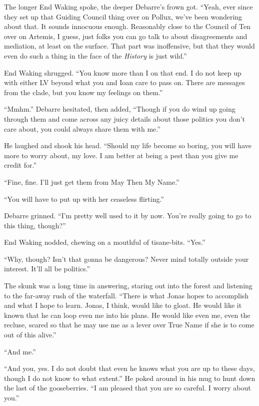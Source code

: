 The longer End Waking spoke, the deeper Debarre's frown got. ``Yeah, ever since they set up that Guiding Council thing over on Pollux, we've been wondering about that. It sounds innocuous enough. Reasonably close to the Council of Ten over on Artemis, I guess, just folks you can go talk to about disagreements and mediation, at least on the surface. That part was inoffensive, but that they would even do such a thing in the face of the \emph{History} is just wild.''

End Waking shrugged. ``You know more than I on that end. I do not keep up with either LV beyond what you and Ioan care to pass on. There are messages from the clade, but you know my feelings on them.''

``Mmhm.'' Debarre hesitated, then added, ``Though if you do wind up going through them and come across any juicy details about those politics you don't care about, you could always share them with me.''

He laughed and shook his head. ``Should my life become so boring, you will have more to worry about, my love. I am better at being a pest than you give me credit for.''

``Fine, fine. I'll just get them from May Then My Name.''

``You will have to put up with her ceaseless flirting.''

Debarre grinned. ``I'm pretty well used to it by now. You're really going to go to this thing, though?''

End Waking nodded, chewing on a mouthful of tisane-bits. ``Yes.''

``Why, though? Isn't that gonna be dangerous? Never mind totally outside your interest. It'll all be politics.''

The skunk was a long time in answering, staring out into the forest and listening to the far-away rush of the waterfall. ``There is what Jonas hopes to accomplish and what I hope to learn. Jonas, I think, would like to gloat. He would like it known that he can loop even me into his plans. He would like even me, even the recluse, scared so that he may use me as a lever over True Name if she is to come out of this alive.''

``And me.''

``And you, yes. I do not doubt that even he knows what you are up to these days, though I do not know to what extent.'' He poked around in his mug to hunt down the last of the gooseberries. ``I am pleased that you are so careful. I worry about you.''

